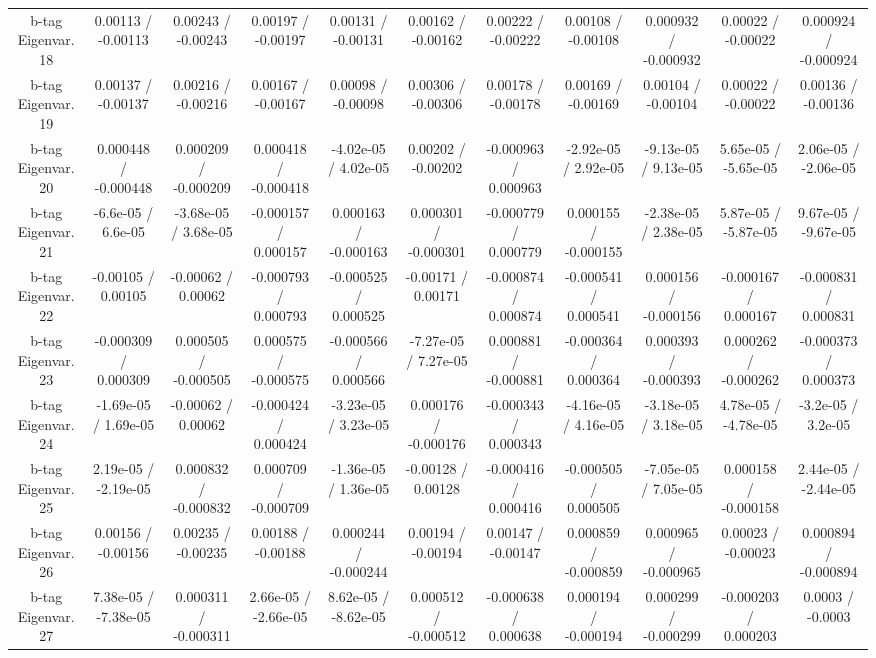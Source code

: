 \begin{table}[htbp]
\begin{center}
\begin{tabular}{|c|c|c|c|c|c|c|c|c|c|c|}
  b-tag Eigenvar. 18 & 0.00113 / -0.00113 & 0.00243 / -0.00243 & 0.00197 / -0.00197 & 0.00131 / -0.00131 & 0.00162 / -0.00162 & 0.00222 / -0.00222 & 0.00108 / -0.00108 & 0.000932 / -0.000932 & 0.00022 / -0.00022 & 0.000924 / -0.000924 \\ 
  b-tag Eigenvar. 19 & 0.00137 / -0.00137 & 0.00216 / -0.00216 & 0.00167 / -0.00167 & 0.00098 / -0.00098 & 0.00306 / -0.00306 & 0.00178 / -0.00178 & 0.00169 / -0.00169 & 0.00104 / -0.00104 & 0.00022 / -0.00022 & 0.00136 / -0.00136 \\ 
  b-tag Eigenvar. 20 & 0.000448 / -0.000448 & 0.000209 / -0.000209 & 0.000418 / -0.000418 & -4.02e-05 / 4.02e-05 & 0.00202 / -0.00202 & -0.000963 / 0.000963 & -2.92e-05 / 2.92e-05 & -9.13e-05 / 9.13e-05 & 5.65e-05 / -5.65e-05 & 2.06e-05 / -2.06e-05 \\ 
  b-tag Eigenvar. 21 & -6.6e-05 / 6.6e-05 & -3.68e-05 / 3.68e-05 & -0.000157 / 0.000157 & 0.000163 / -0.000163 & 0.000301 / -0.000301 & -0.000779 / 0.000779 & 0.000155 / -0.000155 & -2.38e-05 / 2.38e-05 & 5.87e-05 / -5.87e-05 & 9.67e-05 / -9.67e-05 \\ 
  b-tag Eigenvar. 22 & -0.00105 / 0.00105 & -0.00062 / 0.00062 & -0.000793 / 0.000793 & -0.000525 / 0.000525 & -0.00171 / 0.00171 & -0.000874 / 0.000874 & -0.000541 / 0.000541 & 0.000156 / -0.000156 & -0.000167 / 0.000167 & -0.000831 / 0.000831 \\ 
  b-tag Eigenvar. 23 & -0.000309 / 0.000309 & 0.000505 / -0.000505 & 0.000575 / -0.000575 & -0.000566 / 0.000566 & -7.27e-05 / 7.27e-05 & 0.000881 / -0.000881 & -0.000364 / 0.000364 & 0.000393 / -0.000393 & 0.000262 / -0.000262 & -0.000373 / 0.000373 \\ 
  b-tag Eigenvar. 24 & -1.69e-05 / 1.69e-05 & -0.00062 / 0.00062 & -0.000424 / 0.000424 & -3.23e-05 / 3.23e-05 & 0.000176 / -0.000176 & -0.000343 / 0.000343 & -4.16e-05 / 4.16e-05 & -3.18e-05 / 3.18e-05 & 4.78e-05 / -4.78e-05 & -3.2e-05 / 3.2e-05 \\ 
  b-tag Eigenvar. 25 & 2.19e-05 / -2.19e-05 & 0.000832 / -0.000832 & 0.000709 / -0.000709 & -1.36e-05 / 1.36e-05 & -0.00128 / 0.00128 & -0.000416 / 0.000416 & -0.000505 / 0.000505 & -7.05e-05 / 7.05e-05 & 0.000158 / -0.000158 & 2.44e-05 / -2.44e-05 \\ 
  b-tag Eigenvar. 26 & 0.00156 / -0.00156 & 0.00235 / -0.00235 & 0.00188 / -0.00188 & 0.000244 / -0.000244 & 0.00194 / -0.00194 & 0.00147 / -0.00147 & 0.000859 / -0.000859 & 0.000965 / -0.000965 & 0.00023 / -0.00023 & 0.000894 / -0.000894 \\ 
  b-tag Eigenvar. 27 & 7.38e-05 / -7.38e-05 & 0.000311 / -0.000311 & 2.66e-05 / -2.66e-05 & 8.62e-05 / -8.62e-05 & 0.000512 / -0.000512 & -0.000638 / 0.000638 & 0.000194 / -0.000194 & 0.000299 / -0.000299 & -0.000203 / 0.000203 & 0.0003 / -0.0003 \\ 

\end{tabular}
\end{center}
\end{table}
